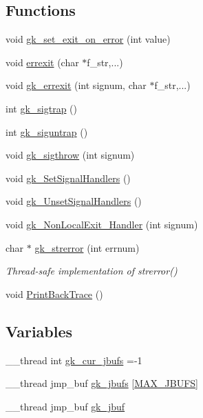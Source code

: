 \subsection*{Functions}
\begin{DoxyCompactItemize}
\item 
void \hyperlink{a00026_ac8478262a791bb8b09708996ad1a548e}{gk\+\_\+set\+\_\+exit\+\_\+on\+\_\+error} (int value)
\item 
void \hyperlink{a00026_a56d0f2cc40cd8633a784582d6200d8b5}{errexit} (char $\ast$f\+\_\+str,...)
\item 
void \hyperlink{a00026_a4c320c13bcdc9967613253ef4c73f59f}{gk\+\_\+errexit} (int signum, char $\ast$f\+\_\+str,...)
\item 
int \hyperlink{a00026_a05869524d1c30cfaab2a8690e7da6fd4}{gk\+\_\+sigtrap} ()
\item 
int \hyperlink{a00026_a08f287b6dbdc0779c916ecbd49540a1e}{gk\+\_\+siguntrap} ()
\item 
void \hyperlink{a00026_ad17d21ff26300b9b5bdb291e8ad2bcef}{gk\+\_\+sigthrow} (int signum)
\item 
void \hyperlink{a00026_a6eadb77c33b5cf46e2faa0a1f7923f50}{gk\+\_\+\+Set\+Signal\+Handlers} ()
\item 
void \hyperlink{a00026_a972beb4b92a7f6e004291460c4d25d4a}{gk\+\_\+\+Unset\+Signal\+Handlers} ()
\item 
void \hyperlink{a00026_affdaa9477b1f6246649bdb3edd6ae49f}{gk\+\_\+\+Non\+Local\+Exit\+\_\+\+Handler} (int signum)
\item 
char $\ast$ \hyperlink{a00026_a4e5e21eb7f29fcdabd4ef027223bbdf0}{gk\+\_\+strerror} (int errnum)
\begin{DoxyCompactList}\small\item\em Thread-\/safe implementation of strerror() \end{DoxyCompactList}\item 
void \hyperlink{a00026_aad9319a482c50504ad3d76158bfed8c7}{Print\+Back\+Trace} ()
\end{DoxyCompactItemize}
\subsection*{Variables}
\begin{DoxyCompactItemize}
\item 
\+\_\+\+\_\+thread int \hyperlink{a00026_a4977ceba83d44d803185a470184ce54c}{gk\+\_\+cur\+\_\+jbufs} =-\/1
\item 
\+\_\+\+\_\+thread jmp\+\_\+buf \hyperlink{a00026_afa4053f358230ff4c0ac3c4e73fc69ce}{gk\+\_\+jbufs} \mbox{[}\hyperlink{a00026_aef49b1cc9e8eb8a2875e26ed0d87a4e6}{M\+A\+X\+\_\+\+J\+B\+U\+FS}\mbox{]}
\item 
\+\_\+\+\_\+thread jmp\+\_\+buf \hyperlink{a00026_abb27fc6bbc48966df357e149f5b6841f}{gk\+\_\+jbuf}
\end{DoxyCompactItemize}


